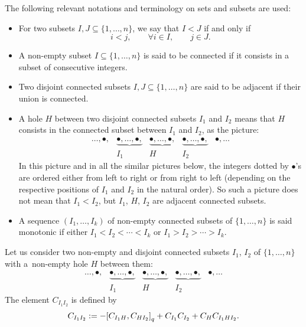\documentclass[pdftex]{sigma}
\numberwithin{equation}{section}
\begin{document}
The following relevant notations and terminology on sets and subsets are used:
\begin{itemize}\itemsep=0pt
 \item For two subsets $I, J \subseteq \{1, \dots, n\}$, we say that $I < J
 $ if and only if
 \begin{equation*}
 i < j , \qquad \forall i \in I, \qquad j \in J.
 \end{equation*}

 \item A non-empty subset $I \subseteq \{1, \dots, n\}$ is said to be connected if it consists in a subset of consecutive integers.

 \item Two disjoint connected subsets $I, J \subseteq \{1, \dots, n\}$ are said to be adjacent if their union is connected.

 \item A hole $H$ between two disjoint connected subsets $I_1$ and $I_2$ means that $H$ consists in the connected subset between $I_1$ and $I_2$, as the picture:
 \begin{equation*}
 \begin{array}{ccccc}
 \dots, \bullet, & \underbrace{ \bullet, \dots, \bullet,} & \underbrace{\bullet, \dots, \bullet,} & \underbrace{\bullet, \dots, \bullet,} & \bullet, \dots\\
 & I_1 & H & I_2 &
 \end{array}
 \end{equation*}
 In this picture and in all the similar pictures below, the integers dotted by $\bullet$'s are ordered either from left to right or from right to left (depending on the respective positions of $I_1$ and $I_2$ in the natural order).
 So such a picture does not mean that $I_1 < I_2$, but $I_1$, $H$, $I_2$ are adjacent connected subsets.
 \item A sequence $(I_1, \dots, I_k)$ of non-empty connected subsets of $\{1, \dots, n\}$ is said monotonic if either $I_1<I_2<\cdots<I_k$ or $I_1> I_2 >\cdots>I_k$.
\end{itemize}

Let us consider two non-empty and disjoint connected subsets $I_1$, $I_2$ of $\{1, \dots, n\}$ with a~non-empty hole $H$ between them:
 \begin{equation*}
 \begin{array}{ccccc}
 \dots, \bullet, & \underbrace{ \bullet, \dots, \bullet,} & \underbrace{\bullet, \dots, \bullet,} & \underbrace{\bullet, \dots, \bullet,} & \bullet, \dots\\
 & I_1 & H & I_2 &
 \end{array}
 \end{equation*}
The element $C_{I_1I_2}$ is defined by
\begin{eqnarray}\label{eqn:C{I_1I_2}}
C_{I_1I_2}:= -{[C_{I_1H}, C_{HI_2}]}_q+C_{I_1}C_{I_2}+C_{H}C_{I_1HI_2}.
\end{eqnarray}
\end{document}

